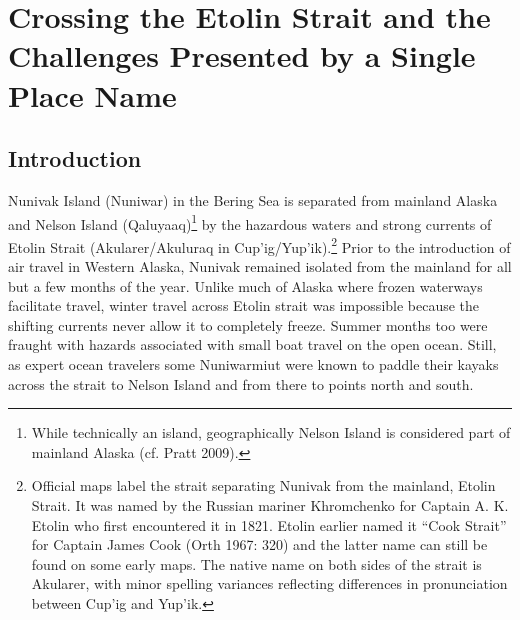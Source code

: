\chapter[Crossing the Etolin Strait and the Challenges Presented by a Single Place Name]{\vspace{-25pt}Crossing the Etolin Strait and the Challenges Presented by a Single Place Name}

\def\authorlast{Drozda}
\renewcommand{\beginchapter}{\pageref{drozda-ch-begin}}
\renewcommand{\finishchapter}{\pageref{drozda-ch-end}}
\label{drozda-ch-begin}
\thispagestyle{firststyle}






\section{Introduction}

Nunivak Island (Nuniwar) in the Bering Sea is separated from mainland Alaska and Nelson Island (Qaluyaaq)\footnote{While technically an island, geographically Nelson Island is considered part of mainland Alaska (cf. Pratt 2009).}  by the hazardous waters and strong currents of Etolin Strait  (Akularer/Akuluraq in Cup’ig/Yup’ik).\footnote{Official maps label the strait separating Nunivak from the mainland, Etolin Strait. It was named by the Russian mariner Khromchenko for Captain A. K. Etolin who first encountered it in 1821. Etolin earlier named it “Cook Strait” for Captain James Cook (Orth 1967: 320) and the latter name can still be found on some early maps. The native name on both sides of the strait is Akularer, with minor spelling variances reflecting differences in pronunciation between Cup’ig and Yup’ik.} Prior to the introduction of air travel in Western Alaska, Nunivak remained isolated from the mainland for all but a few months of the year. Unlike much of Alaska where frozen waterways facilitate travel, winter travel across Etolin strait was impossible because the shifting currents never allow it to completely freeze. Summer months too were fraught with hazards associated with small boat travel on the open ocean. Still, as expert ocean travelers some Nuniwarmiut were known to paddle their kayaks across the strait to Nelson Island and from there to points north and south.


